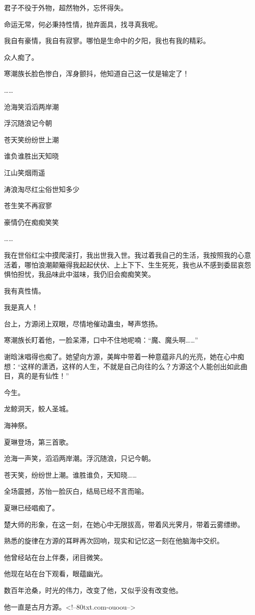 \begin{this_body}
君子不役于外物，超然物外，忘怀得失。

命运无常，何必秉持性情，抛弃面具，找寻真我呢。

我自有豪情，我自有寂寥。哪怕是生命中的夕阳，我也有我的精彩。

众人痴了。

寒潮族长脸色惨白，浑身颤抖，他知道自己这一仗是输定了！

……

沧海笑滔滔两岸潮

浮沉随浪记今朝

苍天笑纷纷世上潮

谁负谁胜出天知晓

江山笑烟雨遥

涛浪淘尽红尘俗世知多少

苍生笑不再寂寥

豪情仍在痴痴笑笑

……

我在世俗红尘中摸爬滚打，我出世我入世。我过着我自己的生活，我按照我的心意活着，哪怕浪潮颠簸得我起起伏伏、上上下下、生生死死，我也从不感到委屈哀怨惧怕担忧，我品味此中滋味，我仍旧会痴痴笑笑。

我有真性情。

我是真人！

台上，方源闭上双眼，尽情地催动蛊虫，琴声悠扬。

寒潮族长盯着他，一脸呆滞，口中不住地呢喃：“魔、魔头啊……”

谢晗沫唱得也痴了。她望向方源，美眸中带着一种意蕴非凡的光亮，她在心中痴想：“这样的潇洒，这样的人生，不就是自己向往的么？方源这个人能创出如此曲目，真的是有仙性！”

今生。

龙鲸洞天，鲛人圣城。

海神祭。

夏琳登场，第三首歌。

沧海一声笑，滔滔两岸潮。浮沉随浪，只记今朝。

苍天笑，纷纷世上潮。谁胜谁负，天知晓……

全场震撼，苏怡一脸灰白，结局已经不言而喻。

夏琳已经唱痴了。

楚大师的形象，在这一刻，在她心中无限拔高，带着风光霁月，带着云雾缥缈。

熟悉的旋律在方源的耳畔再次回响，现实和记忆这一刻在他脑海中交织。

他曾经站在台上伴奏，闭目微笑。

他现在站在台下观看，眼蕴幽光。

数百年沧桑，时光的伟力，改变了他，又似乎没有改变他。

他一直是古月方源。<!--80txt.com-ouoou-->

\end{this_body}

